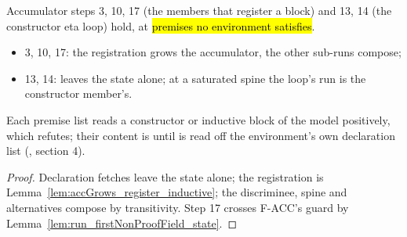 \begin{lemma}
\label{lem:stepAcc_visitConstructor}
\leanok
{}
 Accumulator steps 3, 10, 17 (the members that register a block) and 13, 14 (the
constructor eta loop) hold, at \hl{premises no environment satisfies}.
\begin{itemize}
\item 3, 10, 17: the registration grows the accumulator, the other sub-runs compose;
\item 13, 14:  leaves the state alone; at a saturated spine the loop's run is the
constructor member's.
\end{itemize}
 Each premise list reads a constructor or inductive block of the model positively, which
 refutes; their content is \stOpen{} until  is read off the
environment's own declaration list (, section 4).
\end{lemma}
\begin{proof}
\leanok
{}
 Declaration fetches leave the state alone; the registration is
Lemma~\ref{lem:accGrows_register_inductive}; the discriminee, spine and alternatives compose by
transitivity. Step 17 crosses F-ACC's guard by Lemma~\ref{lem:run_firstNonProofField_state}.
\end{proof}

